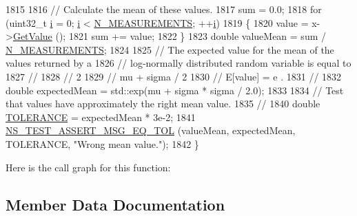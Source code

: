 \begin{DoxyCode}
1815 
1816   \textcolor{comment}{// Calculate the mean of these values.}
1817   sum = 0.0;
1818   \textcolor{keywordflow}{for} (uint32\_t \hyperlink{bernuolliDistribution_8m_a6f6ccfcf58b31cb6412107d9d5281426}{i} = 0; \hyperlink{bernuolliDistribution_8m_a6f6ccfcf58b31cb6412107d9d5281426}{i} < \hyperlink{classRandomVariableStreamLogNormalAntitheticTestCase_aecdc00cd056a3e0ebea556d2209df9e2}{N\_MEASUREMENTS}; ++\hyperlink{bernuolliDistribution_8m_a6f6ccfcf58b31cb6412107d9d5281426}{i})
1819     \{
1820       value = x->\hyperlink{classns3_1_1LogNormalRandomVariable_af37e3543a8416881d09bad093275d349}{GetValue} ();
1821       sum += value;
1822     \}
1823   \textcolor{keywordtype}{double} valueMean = sum / \hyperlink{classRandomVariableStreamLogNormalAntitheticTestCase_aecdc00cd056a3e0ebea556d2209df9e2}{N\_MEASUREMENTS};
1824 
1825   \textcolor{comment}{// The expected value for the mean of the values returned by a}
1826   \textcolor{comment}{// log-normally distributed random variable is equal to }
1827   \textcolor{comment}{//}
1828   \textcolor{comment}{//                             2}
1829   \textcolor{comment}{//                   mu + sigma  / 2}
1830   \textcolor{comment}{//     E[value]  =  e                 .}
1831   \textcolor{comment}{//}
1832   \textcolor{keywordtype}{double} expectedMean = std::exp(mu + sigma * sigma / 2.0);
1833 
1834   \textcolor{comment}{// Test that values have approximately the right mean value.}
1835   \textcolor{comment}{//}
1840 \textcolor{comment}{}  \textcolor{keywordtype}{double} \hyperlink{spectrum-value-test_8cc_a30c17564229ec2e37dfea9c6c9ad643e}{TOLERANCE} = expectedMean * 3e-2;
1841   \hyperlink{group__testing_ga9e7861b56b4e70db3b56044cb7a28e41}{NS\_TEST\_ASSERT\_MSG\_EQ\_TOL} (valueMean, expectedMean, TOLERANCE, \textcolor{stringliteral}{"Wrong mean
       value."}); 
1842 \}
\end{DoxyCode}


Here is the call graph for this function\+:




\subsection{Member Data Documentation}
